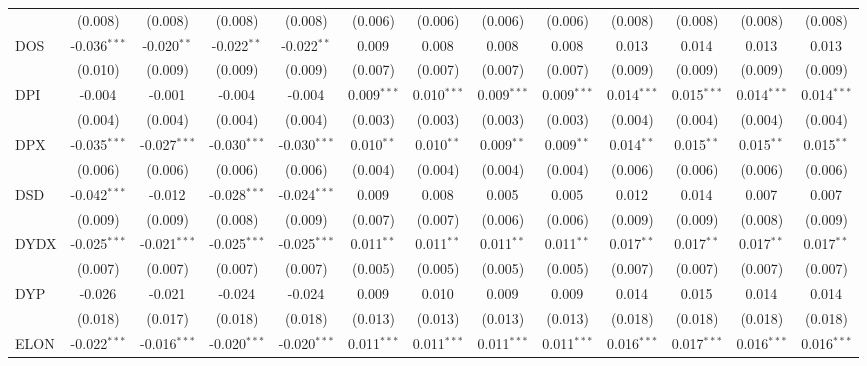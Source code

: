 \begin{table}[!htbp]
\begin{tabular}{@{\extracolsep{5pt}}lcccccccccccc}
  & (0.008) & (0.008) & (0.008) & (0.008) & (0.006) & (0.006) & (0.006) & (0.006) & (0.008) & (0.008) & (0.008) & (0.008) \\
 DOS & -0.036$^{***}$ & -0.020$^{**}$ & -0.022$^{**}$ & -0.022$^{**}$ & 0.009$^{}$ & 0.008$^{}$ & 0.008$^{}$ & 0.008$^{}$ & 0.013$^{}$ & 0.014$^{}$ & 0.013$^{}$ & 0.013$^{}$ \\
  & (0.010) & (0.009) & (0.009) & (0.009) & (0.007) & (0.007) & (0.007) & (0.007) & (0.009) & (0.009) & (0.009) & (0.009) \\
 DPI & -0.004$^{}$ & -0.001$^{}$ & -0.004$^{}$ & -0.004$^{}$ & 0.009$^{***}$ & 0.010$^{***}$ & 0.009$^{***}$ & 0.009$^{***}$ & 0.014$^{***}$ & 0.015$^{***}$ & 0.014$^{***}$ & 0.014$^{***}$ \\
  & (0.004) & (0.004) & (0.004) & (0.004) & (0.003) & (0.003) & (0.003) & (0.003) & (0.004) & (0.004) & (0.004) & (0.004) \\
 DPX & -0.035$^{***}$ & -0.027$^{***}$ & -0.030$^{***}$ & -0.030$^{***}$ & 0.010$^{**}$ & 0.010$^{**}$ & 0.009$^{**}$ & 0.009$^{**}$ & 0.014$^{**}$ & 0.015$^{**}$ & 0.015$^{**}$ & 0.015$^{**}$ \\
  & (0.006) & (0.006) & (0.006) & (0.006) & (0.004) & (0.004) & (0.004) & (0.004) & (0.006) & (0.006) & (0.006) & (0.006) \\
 DSD & -0.042$^{***}$ & -0.012$^{}$ & -0.028$^{***}$ & -0.024$^{***}$ & 0.009$^{}$ & 0.008$^{}$ & 0.005$^{}$ & 0.005$^{}$ & 0.012$^{}$ & 0.014$^{}$ & 0.007$^{}$ & 0.007$^{}$ \\
  & (0.009) & (0.009) & (0.008) & (0.009) & (0.007) & (0.007) & (0.006) & (0.006) & (0.009) & (0.009) & (0.008) & (0.009) \\
 DYDX & -0.025$^{***}$ & -0.021$^{***}$ & -0.025$^{***}$ & -0.025$^{***}$ & 0.011$^{**}$ & 0.011$^{**}$ & 0.011$^{**}$ & 0.011$^{**}$ & 0.017$^{**}$ & 0.017$^{**}$ & 0.017$^{**}$ & 0.017$^{**}$ \\
  & (0.007) & (0.007) & (0.007) & (0.007) & (0.005) & (0.005) & (0.005) & (0.005) & (0.007) & (0.007) & (0.007) & (0.007) \\
 DYP & -0.026$^{}$ & -0.021$^{}$ & -0.024$^{}$ & -0.024$^{}$ & 0.009$^{}$ & 0.010$^{}$ & 0.009$^{}$ & 0.009$^{}$ & 0.014$^{}$ & 0.015$^{}$ & 0.014$^{}$ & 0.014$^{}$ \\
  & (0.018) & (0.017) & (0.018) & (0.018) & (0.013) & (0.013) & (0.013) & (0.013) & (0.018) & (0.018) & (0.018) & (0.018) \\
 ELON & -0.022$^{***}$ & -0.016$^{***}$ & -0.020$^{***}$ & -0.020$^{***}$ & 0.011$^{***}$ & 0.011$^{***}$ & 0.011$^{***}$ & 0.011$^{***}$ & 0.016$^{***}$ & 0.017$^{***}$ & 0.016$^{***}$ & 0.016$^{***}$ \\

\end{tabular}
\end{table}
